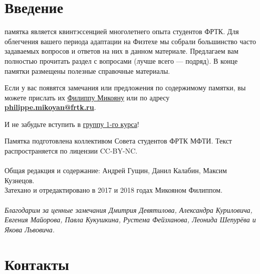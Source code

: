 \documentclass[14pt]{extarticle}
\newenvironment{bottompar}{\par\vspace*{\fill}}{\clearpage}
\begin{document}
\clearpage
\section{Введение}
 памятка является квинтэссенцией многолетнего опыта студентов ФРТК.
Для облегчения вашего периода адаптации на Физтехе мы собрали большинство
часто задаваемых вопросов и ответов на них в данном материале. Предлагаем
вам полностью прочитать раздел с вопросами (лучше всего — подряд). В конце
памятки размещены полезные справочные материалы.

Если у вас появятся замечания или предложения по содержимому памятки, вы
можете прислать их \href{https://vk.com/philalala}{Филиппу Микояну} или по адресу \underline{\textbf{philippe.mikoyan@frtk.ru}}.

И не забудьте вступить в \href{https://vk.com/drec_81x}{группу 1-го курса}!
\begin{bottompar}

Памятка подготовлена коллективом Совета студентов ФРТК МФТИ.
Текст распространяется по лицензии CC-BY-NC.
\\ \\
Общая редакция и содержание: Андрей Гущин, Данил Калабин, Максим Кузнецов.
\\
Затехано и отредактировано в 2017 и 2018 годах Микояном Филиппом.
\\ \\
    \textit{Благодарим за ценные замечания Дмитрия Девятилова, Александра Куриловича, Евгения Майорова, Павла Кукушкина, Рустема Фейзханова, Леонида Шепурёва и Якова Львовича.}

\end{bottompar}
\clearpage
\section{Контакты}
\end{document}

